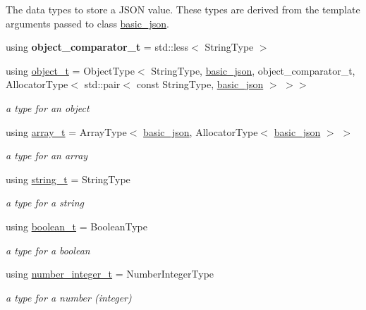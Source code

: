 The data types to store a J\+S\+ON value. These types are derived from the template arguments passed to class \mbox{\hyperlink{classnlohmann_1_1basic__json}{basic\+\_\+json}}. \begin{DoxyCompactItemize}
\item 
\mbox{\label{classnlohmann_1_1basic__json_abed9e77c5fcfc925fcdd489911069c3b}} 
using {\bfseries object\+\_\+comparator\+\_\+t} = std\+::less$<$ String\+Type $>$
\item 
using \mbox{\hyperlink{classnlohmann_1_1basic__json_a5e48a7893520e1314bf0c9723e26ea2a}{object\+\_\+t}} = Object\+Type$<$ String\+Type, \mbox{\hyperlink{classnlohmann_1_1basic__json}{basic\+\_\+json}}, object\+\_\+comparator\+\_\+t, Allocator\+Type$<$ std\+::pair$<$ const String\+Type, \mbox{\hyperlink{classnlohmann_1_1basic__json}{basic\+\_\+json}} $>$ $>$$>$
\begin{DoxyCompactList}\small\item\em a type for an object \end{DoxyCompactList}\item 
using \mbox{\hyperlink{classnlohmann_1_1basic__json_ae095578e03df97c5b3991787f1056374}{array\+\_\+t}} = Array\+Type$<$ \mbox{\hyperlink{classnlohmann_1_1basic__json}{basic\+\_\+json}}, Allocator\+Type$<$ \mbox{\hyperlink{classnlohmann_1_1basic__json}{basic\+\_\+json}} $>$ $>$
\begin{DoxyCompactList}\small\item\em a type for an array \end{DoxyCompactList}\item 
using \mbox{\hyperlink{classnlohmann_1_1basic__json_a61f8566a1a85a424c7266fb531dca005}{string\+\_\+t}} = String\+Type
\begin{DoxyCompactList}\small\item\em a type for a string \end{DoxyCompactList}\item 
using \mbox{\hyperlink{classnlohmann_1_1basic__json_a4c919102a9b4fe0d588af64801436082}{boolean\+\_\+t}} = Boolean\+Type
\begin{DoxyCompactList}\small\item\em a type for a boolean \end{DoxyCompactList}\item 
using \mbox{\hyperlink{classnlohmann_1_1basic__json_a98e611d67b7bd75307de99c9358ab2dc}{number\+\_\+integer\+\_\+t}} = Number\+Integer\+Type
\begin{DoxyCompactList}\small\item\em a type for a number (integer) \end{DoxyCompactList}\item 
$$
\end{DoxyCompactItemize}

